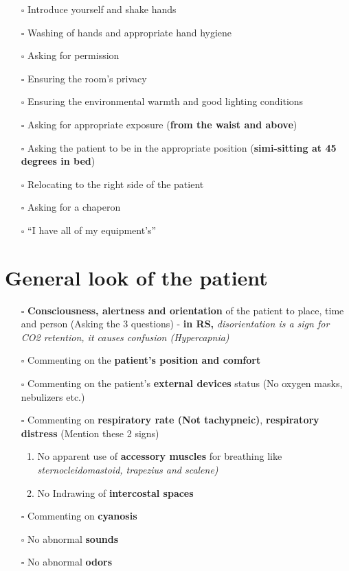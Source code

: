 \documentclass[
  13.5pt,
  a4paper,
  DIV=11,
  numbers=noendperiod]{scrreprt}
\providecommand{\tightlist}{%
  \setlength{\itemsep}{0pt}\setlength{\parskip}{0pt}}
\begin{document}
\begin{itemize}
\tightlist
\item[$\square$]
  Introduce yourself and shake hands
\item[$\square$]
  Washing of hands and appropriate hand hygiene
\item[$\square$]
  Asking for permission
\item[$\square$]
  Ensuring the room's privacy
\item[$\square$]
  Ensuring the environmental warmth and good lighting conditions
\item[$\square$]
  Asking for appropriate exposure (\textbf{from the waist and above})
\item[$\square$]
  Asking the patient to be in the appropriate position
  (\textbf{simi-sitting at 45 degrees in bed})
\item[$\square$]
  Relocating to the right side of the patient
\item[$\square$]
  Asking for a chaperon
\item[$\square$]
  ``I have all of my equipment's''
\end{itemize}

\section{General look of the
patient}\label{general-look-of-the-patient-1}

\begin{itemize}
\tightlist
\item[$\square$]
  \textbf{Consciousness, alertness and orientation} of the patient to
  place, time and person (Asking the 3 questions) - \textbf{in RS,}
  \emph{disorientation is a sign for CO2 retention, it causes confusion
  (Hypercapnia)}
\item[$\square$]
  Commenting on the \textbf{patient's position and comfort}
\item[$\square$]
  Commenting on the patient's \textbf{external devices} status (No
  oxygen masks, nebulizers etc.)
\item[$\square$]
  Commenting on \textbf{respiratory rate (Not tachypneic)},
  \textbf{respiratory distress} (Mention these 2 signs)

  \begin{enumerate}
  \def\labelenumi{\arabic{enumi})}
  \tightlist
  \item
    No apparent use of \textbf{accessory muscles} for breathing like
    \emph{sternocleidomastoid, trapezius and scalene)}\\
  \item
    No Indrawing of \textbf{intercostal spaces}
  \end{enumerate}
\item[$\square$]
  Commenting on \textbf{cyanosis}
\item[$\square$]
  No abnormal \textbf{sounds}
\item[$\square$]
  No abnormal \textbf{odors}
\end{itemize}
\end{document}
